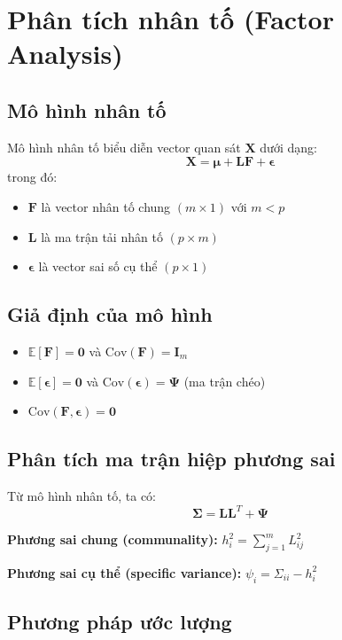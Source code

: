 \section{Phân tích nhân tố (Factor Analysis)}

\subsection{Mô hình nhân tố}
\begin{dn}
Mô hình nhân tố biểu diễn vector quan sát $\mathbf{X}$ dưới dạng:
\[
\mathbf{X} = \boldsymbol{\mu} + \mathbf{L}\mathbf{F} + \boldsymbol{\epsilon}
\]
trong đó:
\begin{itemize}
    \item $\mathbf{F}$ là vector nhân tố chung $(m \times 1)$ với $m < p$
    \item $\mathbf{L}$ là ma trận tải nhân tố $(p \times m)$
    \item $\boldsymbol{\epsilon}$ là vector sai số cụ thể $(p \times 1)$
\end{itemize}
\end{dn}

\subsection{Giả định của mô hình}
\begin{itemize}
    \item $\mathbb{E}[\mathbf{F}] = \mathbf{0}$ và $\text{Cov}(\mathbf{F}) = \mathbf{I}_m$
    \item $\mathbb{E}[\boldsymbol{\epsilon}] = \mathbf{0}$ và $\text{Cov}(\boldsymbol{\epsilon}) = \boldsymbol{\Psi}$ (ma trận chéo)
    \item $\text{Cov}(\mathbf{F}, \boldsymbol{\epsilon}) = \mathbf{0}$
\end{itemize}

\subsection{Phân tích ma trận hiệp phương sai}
Từ mô hình nhân tố, ta có:
\[
\boldsymbol{\Sigma} = \mathbf{L}\mathbf{L}^T + \boldsymbol{\Psi}
\]

\textbf{Phương sai chung (communality):} $h_i^2 = \sum_{j=1}^m L_{ij}^2$

\textbf{Phương sai cụ thể (specific variance):} $\psi_i = \Sigma_{ii} - h_i^2$

\subsection{Phương pháp ước lượng}
